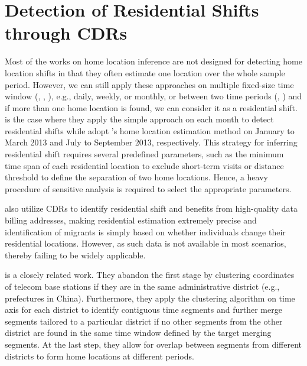 

\section{Detection of Residential Shifts through CDRs}\label{sec:2_detection_of_residential_shifts_through_cdrs}
Most of the works on home location inference are not designed for detecting home location shifts in that they often estimate one location over the whole sample period.
However, we can still apply these approaches on multiple fixed-size time window (\cite{blumenstock2012inferring}, \cite{phithakkitnukoon2022inferring}, \cite{blumenstock2025migration}), e.g., daily, weekly, or monthly, or between two time periods (\cite{lai2019exploring}, \cite{dias2022framework}) and if more than one home location is found, we can consider it as a residential shift.
\cite{phithakkitnukoon2022inferring} is the case where they apply the simple approach on each month to detect residential shifts while \cite{dias2022framework} adopt \cite{isaacman2011identifying}'s home location estimation method on January to March 2013 and July to September 2013, respectively.
This strategy for inferring residential shift requires several predefined parameters, such as the minimum time span of each residential location to exclude short-term visits or distance threshold to define the separation of two home locations.
Hence, a heavy procedure of sensitive analysis is required to select the appropriate parameters.

\cite{buchel2020calling} also utilize CDRs to identify residential shift and benefits from high-quality data billing addresses, making residential estimation extremely precise and identification of migrants is simply based on whether individuals change their residential locations.
However, as such data is not available in most scenarios, thereby failing to be widely applicable.

\cite{chi2020general} is a closely related work.
They abandon the first stage by clustering coordinates of telecom base stations if they are in the same administrative district (e.g., prefectures in China).
Furthermore, they apply the clustering algorithm on time axis for each district to identify contiguous time segments and further merge segments tailored to a particular district if no other segments from the other district are found in the same time window defined by the target merging segments.
At the last step, they allow for overlap between segments from different districts to form home locations at different periods.

